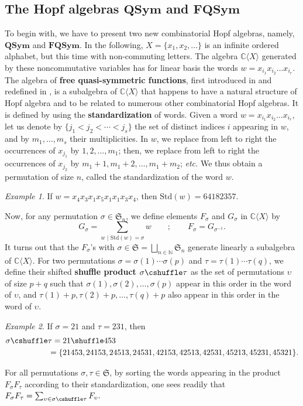 \documentclass[smallextended,nospthms]{svjour3}
\theoremstyle{remark}
\newtheorem*{example}{Example}
\newcommand{\N}{\mathbb{N}}
\newcommand{\C}{\mathbb{C}}
\newcommand{\sym}{\mathfrak{S}}
\newcommand{\QSym}{\mathbf{QSym}}
\newcommand{\FQSym}{\mathbf{FQSym}}
\begin{document}
\subsection{The Hopf algebras $\QSym$ and $\FQSym$}\label{fqsym}
To begin with, we have to present two new combinatorial Hopf algebras, namely, $\QSym$ and $\FQSym$. In the following, $X=\{x_{1},x_{2},\ldots\}$ is an infinite ordered alphabet, but this time with non-commuting letters. The algebra $\C\langle X\rangle$ generated by these noncommutative variables has for linear basis the words $w=x_{i_{1}}x_{i_{2}}\ldots x_{i_{r}}$. The algebra of \textbf{free quasi-symmetric functions}, first introduced in \cite{MR95} and redefined in \cite{NCSF6}, is a subalgebra of $\C\langle X\rangle$ that happens to have a natural structure of Hopf algebra and to be related to numerous other combinatorial Hopf algebras. It is defined by using the \textbf{standardization} of words. Given a word $w=x_{i_{1}}x_{i_{2}}\ldots x_{i_{r}}$, let us denote by $\{j_{1} <j_{2}<\cdots <j_{s}\}$ the set of distinct indices $i$ appearing in $w$, and by $m_{1},\ldots,m_{s}$ their multiplicities. In $w$, we replace from left to right the occurrences of $x_{j_{1}}$ by $1,2,\ldots, m_{1}$; then, we replace from left to right the occurrences of $x_{j_{2}}$ by $m_{1}+1,m_{1}+2,\ldots,m_{1}+m_{2}$; \emph{etc.} We thus obtain a permutation of size $n$, called the standardization of the word $w$.
\begin{example}
If $w=x_{4}x_{3}x_{1}x_{5}x_{1}x_{1}x_{3}x_{4}$, then $\mathrm{Std}(w)=64182357$.
\end{example}\bigskip

Now, for any permutation $\sigma \in \sym_{n}$, we define elements $F_{\sigma}$ and $G_{\sigma}$ in $\C\langle X \rangle$ by
$$G_{\sigma}=\sum_{w\,\,|\,\,\mathrm{Std}(w)=\sigma}w\qquad;\qquad F_{\sigma}=G_{\sigma^{-1}}.$$
It turns out that the $F_{\sigma}$'s with $\sigma \in \sym=\bigsqcup_{n \in\N}\sym_{n}$ generate linearly a subalgebra of $\C\langle X \rangle$. For two permutations $\sigma=\sigma(1)\cdots \sigma(p)$ and $\tau=\tau(1)\cdots \tau(q)$, we define their shifted \textbf{shuffle product} $\sigma \cshuffle \tau$ as the set of permutations $\upsilon$ of size $p+q$ such that $\sigma(1),\sigma(2),\ldots, \sigma(p)$ appear in this order in the word of $\upsilon$, and $\tau(1)+p,\tau(2)+p,\ldots,\tau(q)+p$ also appear in this order in the word of $\upsilon$.
\begin{example}
If $\sigma=21$ and $\tau=231$, then 
\begin{align*}
\sigma \cshuffle \tau&= 21 \shuffle 453\\
&\!\!\!=\{21453,24153,24513,24531,42153,42513,42531,45213,45231,45321\}.
\end{align*}

\end{example}
\noindent For all permutations $\sigma,\tau \in \sym$, by sorting the words appearing in the product $F_{\sigma}F_{\tau}$ according to their standardization, one sees readily that
$F_{\sigma}F_{\tau}=\sum_{\upsilon \in \sigma\cshuffle\tau}F_{\upsilon}.$\bigskip
\end{document}
